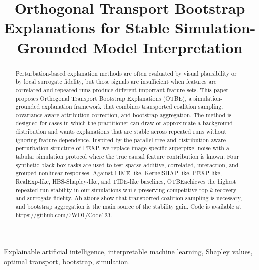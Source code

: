 \documentclass[10pt,conference,letterpaper]{IEEEtran}
\newcommand{\method}{OTBE}
\begin{document}

\title{Orthogonal Transport Bootstrap Explanations for Stable Simulation-Grounded Model Interpretation}

\author{
}

\maketitle

\begin{abstract}
Perturbation-based explanation methods are often evaluated by visual plausibility or by local surrogate fidelity, but those signals are insufficient when features are correlated and repeated runs produce different important-feature sets.  This paper proposes Orthogonal Transport Bootstrap Explanations (\method), a simulation-grounded explanation framework that combines transported coalition sampling, covariance-aware attribution correction, and bootstrap aggregation.  The method is designed for cases in which the practitioner can draw or approximate a background distribution and wants explanations that are stable across repeated runs without ignoring feature dependence.  Inspired by the parallel-tree and distribution-aware perturbation structure of PEXP, we replace image-specific superpixel noise with a tabular simulation protocol where the true causal feature contribution is known.  Four synthetic black-box tasks are used to test sparse additive, correlated, interaction, and grouped nonlinear responses.  Against LIME-like, KernelSHAP-like, PEXP-like, RealExp-like, HBS-Shapley-like, and TIDE-like baselines, \method achieves the highest repeated-run stability in our simulations while preserving competitive top-$k$ recovery and surrogate fidelity.  Ablations show that transported coalition sampling is necessary, and bootstrap aggregation is the main source of the stability gain.  Code is available at \url{https://github.com/7WD1/Code123}.
\end{abstract}

\begin{IEEEkeywords}
Explainable artificial intelligence, interpretable machine learning, Shapley values, optimal transport, bootstrap, simulation.
\end{IEEEkeywords}
\end{document}
